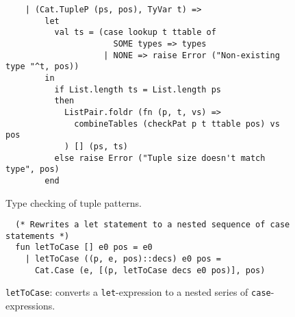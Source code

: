 \begin{figure}
    \centering
    \begin{lstlisting}
    | (Cat.TupleP (ps, pos), TyVar t) =>
        let
          val ts = (case lookup t ttable of
                      SOME types => types
                    | NONE => raise Error ("Non-existing type "^t, pos))
        in
          if List.length ts = List.length ps
          then
            ListPair.foldr (fn (p, t, vs) =>
              combineTables (checkPat p t ttable pos) vs pos
            ) [] (ps, ts)
          else raise Error ("Tuple size doesn't match type", pos)
        end
    \end{lstlisting}
    \caption{Type checking of tuple patterns.}
    \label{fig:type:tuplep}
\end{figure}
\begin{figure}
    \centering
    \begin{lstlisting}
  (* Rewrites a let statement to a nested sequence of case statements *)
  fun letToCase [] e0 pos = e0
    | letToCase ((p, e, pos)::decs) e0 pos =
      Cat.Case (e, [(p, letToCase decs e0 pos)], pos)
    \end{lstlisting}
    \caption{\texttt{letToCase}: converts a \texttt{let}-expression to a nested series of \texttt{case}-expressions.}
    \label{fig:type:lettocase}
\end{figure}
